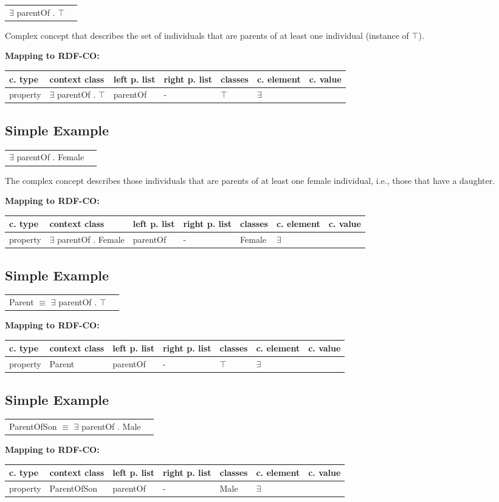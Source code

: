 \documentclass{llncs}
\newenvironment{gcotable}{
  \scriptsize
  \sffamily
  \vspace{0cm}
	\begin{center}
	\textbf{\vspace{0.4cm}Mapping to RDF-CO:} \\
  \begin{tabular}{l|l|l|l|l|l|l}
	\hline
  \textbf{c. type} & \textbf{context class} & \textbf{left p. list} & \textbf{right p. list} & \textbf{classes} & \textbf{c. element} & \textbf{c. value} \\
  \hline

}{
  \hline
  \end{tabular}
	\end{center}
}
\newenvironment{DL}{
  \vspace{0cm}
	\begin{center}
  \begin{tabular}{r l}

}{
  \end{tabular}
	\end{center}
}
\begin{document}
\begin{DL}
$\exists$ parentOf . $\top$
\end{DL}

Complex concept that describes the set
of individuals that are parents of at least one individual (instance of $\top$). 

\begin{gcotable}
property & $\exists$ parentOf . $\top$ & parentOf & - & $\top$ & $\exists$ \\
\end{gcotable}

\subsection{Simple Example}

\begin{DL}
$\exists$ parentOf . Female
\end{DL}

The complex concept describes those individuals that are parents of at least one
female individual, i.e., those that have a daughter.

\begin{gcotable}
property & $\exists$ parentOf . Female & parentOf & - & Female & $\exists$ \\
\end{gcotable}

\subsection{Simple Example}

\begin{DL}
Parent $\equiv$ $\exists$ parentOf . $\top$
\end{DL}

\begin{gcotable}
property & Parent & parentOf & - & $\top$ & $\exists$ \\
\end{gcotable}

\subsection{Simple Example}

\begin{DL}
ParentOfSon $\equiv$ $\exists$ parentOf . Male
\end{DL}

\begin{gcotable}
property & ParentOfSon & parentOf & - & Male & $\exists$ \\
\end{gcotable}
\end{document}
